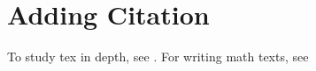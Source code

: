 \section{Adding Citation}

To study tex in depth, see \cite{tex1}. For writing math texts, see \cite{tex2}